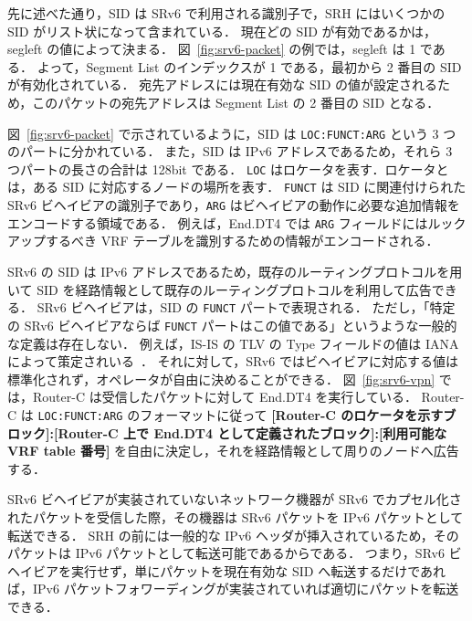 先に述べた通り，SID は SRv6 で利用される識別子で，SRH にはいくつかの SID がリスト状になって含まれている．
現在どの SID が有効であるかは，segleft の値によって決まる．
図~\ref*{fig:srv6-packet} の例では，segleft は 1 である．
よって，Segment List のインデックスが 1 である，最初から 2 番目の SID が有効化されている．
宛先アドレスには現在有効な SID の値が設定されるため，このパケットの宛先アドレスは Segment List の 2 番目の SID となる．

図~\ref*{fig:srv6-packet} で示されているように，SID は \texttt{LOC:FUNCT:ARG} という 3 つのパートに分かれている．
また，SID は IPv6 アドレスであるため，それら 3 つパートの長さの合計は 128bit である．
\texttt{LOC} はロケータを表す．ロケータとは，ある SID に対応するノードの場所を表す．
\texttt{FUNCT} は SID に関連付けられた SRv6 ビヘイビアの識別子であり，\texttt{ARG} はビヘイビアの動作に必要な追加情報をエンコードする領域である．
例えば，End.DT4 では \texttt{ARG} フィールドにはルックアップするべき VRF テーブルを識別するための情報がエンコードされる．

SRv6 の SID は IPv6 アドレスであるため，既存のルーティングプロトコルを用いて SID を経路情報として既存のルーティングプロトコルを利用して広告できる．
SRv6 ビヘイビアは，SID の \texttt{FUNCT} パートで表現される．
ただし，「特定の SRv6 ビヘイビアならば \texttt{FUNCT} パートはこの値である」というような一般的な定義は存在しない．
例えば，IS-IS の TLV の Type フィールドの値は IANA によって策定されいる~\cite{iana-isis}．
それに対して，SRv6 ではビヘイビアに対応する値は標準化されず，オペレータが自由に決めることができる．
図~\ref*{fig:srv6-vpn}  では，Router-C は受信したパケットに対して End.DT4 を実行している．
Router-C は \texttt{LOC:FUNCT:ARG} のフォーマットに従って \textbf{[Router-C のロケータを示すブロック]:[Router-C 上で End.DT4 として定義されたブロック]:[利用可能な VRF table 番号]} を自由に決定し，それを経路情報として周りのノードへ広告する．

SRv6 ビヘイビアが実装されていないネットワーク機器が SRv6 でカプセル化されたパケットを受信した際，その機器は SRv6 パケットを IPv6 パケットとして転送できる．
SRH の前には一般的な IPv6 ヘッダが挿入されているため，そのパケットは IPv6 パケットとして転送可能であるからである．
つまり，SRv6 ビヘイビアを実行せず，単にパケットを現在有効な SID へ転送するだけであれば，IPv6 パケットフォワーディングが実装されていれば適切にパケットを転送できる．

